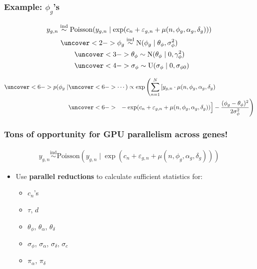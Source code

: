 \documentclass[handout]{beamer}
\providecommand{\e}{\varepsilon}
\numberwithin{equation}{section}
\begin{document}
\begin{frame}
\frametitle{Example: $\phi_g$'s} \small
\begin{align*}
&y_{g,n} \stackrel{\text{ind}}{\sim} \text{Poisson}(y_{g, n} \mid \exp(c_n + \e_{g, n} + \mu(n, \phi_g, \alpha_g, \delta_g))) \\
& \qquad \uncover<2->{\phi_g \stackrel{\text{ind}}{\sim} \text{N}(\phi_g \mid \theta_\phi, \sigma_\phi^2)} \\
& \qquad \qquad \uncover<3->{\theta_\phi \stackrel{\text{}}{\sim} \text{N}(\theta_\phi \mid 0, \gamma_{\phi }^2)} \\
& \qquad \qquad \uncover<4->{\sigma_\phi \stackrel{\text{}}{\sim} \text{U}(\sigma_\phi \mid 0, \sigma_{\phi 0})} \\
\end{align*}

\begin{itemize}
\end{itemize}

\begin{align*}
\uncover<6->{p(\phi_g \mid} & \uncover<6->{ \cdots) \propto \exp \left (\sum_{n = 1}^N \left [y_{g, n} \cdot \mu(n, \phi_g, \alpha_g, \delta_g) \right . \right .}  \\
&\uncover<6->{\left . \left . \frac{}{}- \exp (c_n + \e_{g, n} + \mu(n, \phi_g, \alpha_g, \delta_g)) \right ] - \frac{(\phi_g - \theta_\phi)^2}{2 \sigma_\phi^2} \right )}
\end{align*}
\end{frame}


\begin{frame}
\frametitle{Tons of opportunity for GPU parallelism across genes!}
\begin{align*}
y_{g,n} \stackrel{\text{ind}}{\sim} \text{Poisson}(y_{g, n} \mid \exp(c_n + \e_{g, n} + \mu(n, \phi_g, \alpha_g, \delta_g)))
\end{align*}

\begin{itemize}
\pause \item Use {\color{blue} \bf parallel reductions} to calculate sufficient statistics for:
\begin{itemize}
\pause \item $c_n$'s
\pause \item $\tau$, $d$
\pause \item $\theta_\phi$, $\theta_\alpha$, $\theta_\delta$
\pause \item $\sigma_\phi$, $\sigma_\alpha$, $\sigma_\delta$,  $\sigma_c$ 
\pause \item $\pi_\alpha$, $\pi_\delta$
\end{itemize}
\end{itemize}
\end{frame}
\end{document}
